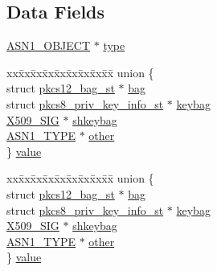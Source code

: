 \subsection*{Data Fields}
\begin{DoxyCompactItemize}
\item 
\hyperlink{crypto_2ossl__typ_8h_ae3fda0801e4c8e250087052bafb3ce2e}{A\+S\+N1\+\_\+\+O\+B\+J\+E\+CT} $\ast$ \hyperlink{struct_p_k_c_s12___s_a_f_e_b_a_g_a208650820ad37e29d3433d9f20665c28}{type}
\item 
\begin{tabbing}
xx\=xx\=xx\=xx\=xx\=xx\=xx\=xx\=xx\=\kill
union \{\\
\>struct \hyperlink{structpkcs12__bag__st}{pkcs12\_bag\_st} $\ast$ \hyperlink{struct_p_k_c_s12___s_a_f_e_b_a_g_a01affb784e606de6ca9d009011c6dbac}{bag}\\
\>struct \hyperlink{structpkcs8__priv__key__info__st}{pkcs8\_priv\_key\_info\_st} $\ast$ \hyperlink{struct_p_k_c_s12___s_a_f_e_b_a_g_a69e0a46266dcba20597e039af58377d0}{keybag}\\
\>\hyperlink{crypto_2x509_2x509_8h_a84b39cf74cc1ae6512f7d4481f5f4404}{X509\_SIG} $\ast$ \hyperlink{struct_p_k_c_s12___s_a_f_e_b_a_g_a79f07c88e77ba8b884eb8d941790db0c}{shkeybag}\\
\>\hyperlink{crypto_2asn1_2asn1_8h_a7895e03d9fee2bc4963faf2a31a9439e}{ASN1\_TYPE} $\ast$ \hyperlink{struct_p_k_c_s12___s_a_f_e_b_a_g_a913b5f8be6ebbc8d847d25c9279ee3d2}{other}\\
\} \hyperlink{struct_p_k_c_s12___s_a_f_e_b_a_g_a050eeec52efc7b626b50e04105a9192b}{value}\\

\end{tabbing}\item 
\begin{tabbing}
xx\=xx\=xx\=xx\=xx\=xx\=xx\=xx\=xx\=\kill
union \{\\
\>struct \hyperlink{structpkcs12__bag__st}{pkcs12\_bag\_st} $\ast$ \hyperlink{struct_p_k_c_s12___s_a_f_e_b_a_g_a01affb784e606de6ca9d009011c6dbac}{bag}\\
\>struct \hyperlink{structpkcs8__priv__key__info__st}{pkcs8\_priv\_key\_info\_st} $\ast$ \hyperlink{struct_p_k_c_s12___s_a_f_e_b_a_g_a69e0a46266dcba20597e039af58377d0}{keybag}\\
\>\hyperlink{crypto_2x509_2x509_8h_a84b39cf74cc1ae6512f7d4481f5f4404}{X509\_SIG} $\ast$ \hyperlink{struct_p_k_c_s12___s_a_f_e_b_a_g_a79f07c88e77ba8b884eb8d941790db0c}{shkeybag}\\
\>\hyperlink{crypto_2asn1_2asn1_8h_a7895e03d9fee2bc4963faf2a31a9439e}{ASN1\_TYPE} $\ast$ \hyperlink{struct_p_k_c_s12___s_a_f_e_b_a_g_a913b5f8be6ebbc8d847d25c9279ee3d2}{other}\\
\} \hyperlink{struct_p_k_c_s12___s_a_f_e_b_a_g_a219b93f612268557bd5b2b92b141e962}{value}\\

\end{tabbing}\end{DoxyCompactItemize}


